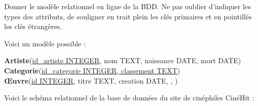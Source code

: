 \documentclass[a4paper,10pt]{article}
\begin{document}
Donner le modèle relationnel en ligne de la BDD. Ne pas oublier d'indiquer les types des attributs, de souligner en trait plein les clés primaires et en pointillés les clés étrangères.

\begin{encadre}[Réponse]
Voici un modèle possible :

\textbf{Artiste}(\uline{id\_artiste INTEGER}, nom TEXT, naissance DATE, mort DATE)\\

\textbf{Categorie}(\uline{id\_categorie INTEGER, classement TEXT})\\

\textbf{Œuvre}(\uline{id INTEGER}, titre TEXT, creation DATE, , )
\end{encadre}



Voici le schéma relationnel de la base de données du site de cinéphiles CinéHit :\\
\end{document}
